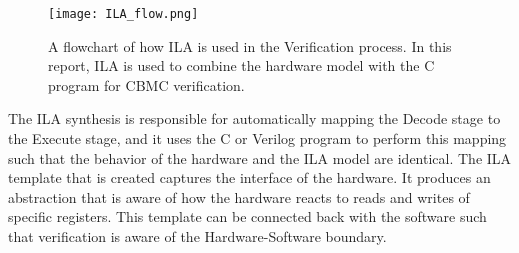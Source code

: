 \begin{figure}
  \centering
  \texttt{[image: ILA\_flow.png]}
  \caption[ILA Verification Flowchart]{A flowchart of how ILA is used in the Verification process.
  In this report, ILA is used to combine the hardware model with the C program for CBMC verification.}
  \label{fig:ILA_flow}
\end{figure}

The ILA synthesis is responsible for automatically mapping the Decode stage to
the Execute stage, and it uses the C or Verilog program to perform this mapping
such that the behavior of the hardware and the ILA model are identical.
The ILA template that is created captures the interface of the hardware.
It produces an abstraction that is aware of how the hardware reacts to reads and
writes of specific registers.
This template can be connected back with the software such that verification is
aware of the Hardware-Software boundary.
